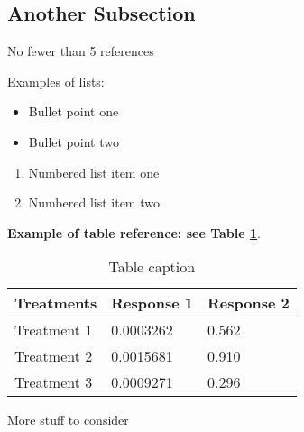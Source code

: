 \subsection{Another Subsection}

No fewer than 5 references



Examples of lists:
\begin{itemize}
\item Bullet point one
\item Bullet point two
\end{itemize}

\begin{enumerate}
\item Numbered list item one
\item Numbered list item two
\end{enumerate}

\textbf{Example of table reference: see Table \ref{tab:example}}.
\lipsum[4]

\begin{table}[ht] 
\centering
\begin{tabular}{l l l}
\hline
\textbf{Treatments} & \textbf{Response 1} & \textbf{Response 2}\\
\hline
Treatment 1 & 0.0003262 & 0.562 \\
Treatment 2 & 0.0015681 & 0.910 \\
Treatment 3 & 0.0009271 & 0.296 \\
\hline
\end{tabular}
\caption{Table caption}
\label{tab:example}
\end{table}

More stuff to consider \lipsum[1]